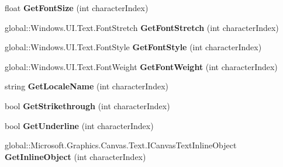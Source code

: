 \begin{DoxyCompactItemize}
float {\bfseries Get\+Font\+Size} (int character\+Index)
\item 
\mbox{\label{class_microsoft_1_1_graphics_1_1_canvas_1_1_text_1_1_canvas_text_layout_a7ae8624ebdfdcb49fb9d365b6c8c6404}} 
global\+::\+Windows.\+U\+I.\+Text.\+Font\+Stretch {\bfseries Get\+Font\+Stretch} (int character\+Index)
\item 
\mbox{\label{class_microsoft_1_1_graphics_1_1_canvas_1_1_text_1_1_canvas_text_layout_a84a97afe4a7b871703795677195da761}} 
global\+::\+Windows.\+U\+I.\+Text.\+Font\+Style {\bfseries Get\+Font\+Style} (int character\+Index)
\item 
\mbox{\label{class_microsoft_1_1_graphics_1_1_canvas_1_1_text_1_1_canvas_text_layout_ad0c1b485da46a633fa7740206bc21f8f}} 
global\+::\+Windows.\+U\+I.\+Text.\+Font\+Weight {\bfseries Get\+Font\+Weight} (int character\+Index)
\item 
\mbox{\label{class_microsoft_1_1_graphics_1_1_canvas_1_1_text_1_1_canvas_text_layout_ad1e03e0c5fae952c5b9c1e2dc0efe6de}} 
string {\bfseries Get\+Locale\+Name} (int character\+Index)
\item 
\mbox{\label{class_microsoft_1_1_graphics_1_1_canvas_1_1_text_1_1_canvas_text_layout_ab63ecf60b01e515ff2edd6dc7d621cb6}} 
bool {\bfseries Get\+Strikethrough} (int character\+Index)
\item 
\mbox{\label{class_microsoft_1_1_graphics_1_1_canvas_1_1_text_1_1_canvas_text_layout_af3519becd05a01693db79181913fc3c2}} 
bool {\bfseries Get\+Underline} (int character\+Index)
\item 
\mbox{\label{class_microsoft_1_1_graphics_1_1_canvas_1_1_text_1_1_canvas_text_layout_a6ff3475276bd3f81526b7bdfe692a997}} 
global\+::\+Microsoft.\+Graphics.\+Canvas.\+Text.\+I\+Canvas\+Text\+Inline\+Object {\bfseries Get\+Inline\+Object} (int character\+Index)

\end{DoxyCompactItemize}
